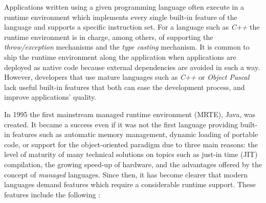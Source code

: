 Applications written using a given programming language often execute in a runtime environment which implements every single built-in feature of the language and supports a specific instruction set.
For a language such as \textit{C++} the runtime environment is in charge, among others, of supporting the \textit{throw/exception} mechanisms and the \textit{type casting} mechanism.
It is common to ship the runtime environment along the application when applications are deployed as native code because external dependencies are avoided in such a way.
However, developers that use mature languages such as \textit{C++} or \textit{Object Pascal} lack useful built-in features that both can ease the development process, and improve applications' quality.

In 1995 the first mainstream managed runtime environment (MRTE), Java, was created. It became a success even if it was not the first language providing built-in features such as automatic memory management, dynamic loading of portable code, or support for the object-oriented paradigm due to three main reasons: the level of maturity of many technical solutions on topics such as just-in time (JIT) compilation, the growing speed-up of hardware, and the advantages offered by the concept of \textit{managed} languages.
Since then, it has become clearer that modern languages demand features which require a considerable runtime support.
These features include the following \cite{Cierniak2005}:

